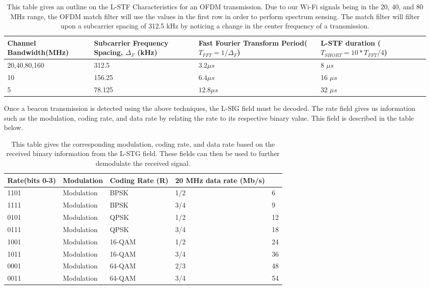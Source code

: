 \begin{table}[ht!]
	\centering
	\caption{This table gives an outline on the L-STF Characteristics for an OFDM transmission. Due to our Wi-Fi signals being in the 20, 40, and 80 MHz range, the OFDM match filter will use the values in the first row in order to perform spectrum sensing. The match filter will filter upon a subcarrier spacing of 312.5 kHz by noticing a change in the center frequency of a transmission.}	
\begin{tabular}{|p{3.6cm}|p{4cm}|p{4cm}|p{4.5cm}|}
	\hline
	Channel Bandwidth\newline(MHz) & Subcarrier Frequency Spacing, $\Delta_F$ (kHz) &Fast Fourier Transform Period\newline($T_{FFT}=1/\Delta_F$)& L-STF duration \newline($T_{SHORT}=10*T_{FFT}/4$) \\
	\hline
	20,40,80,160 & 312.5 &3.2$\mu s$ &8 $\mu s$ \\
	10 & 156.25 &$6.4\mu s$ &16 $\mu s $\\
	5 & 78.125 &$12.8\mu s$ &32 $\mu s$  \\
	\hline
\end{tabular} 

	\label{table:spacing}
\end{table} \par 
	
Once a beacon transmission is detected using the above techniques, the L-SIG field must be decoded. The rate field gives us information such as the modulation, coding rate, and data rate by relating the rate to its respective binary value. This field is described in the table below.
\begin{table}[ht!]
	\centering
		\caption{This table gives the corresponding modulation, coding rate, and data rate based on the received binary information from the L-STG field. These fields can then be used to further demodulate the received signal.}
	\begin{tabular}{|l|l|l|l|l|}
		\hline
		Rate(bits 0-3) & Modulation & Coding Rate (R) & 20 MHz data rate (Mb/s) & \\
		\hline
		1101 & Modulation & BPSK & 1/2 & 6 \\
		1111 & Modulation & BPSK & 3/4 & 9 \\
		0101 & Modulation & QPSK & 1/2 & 12 \\
		0111 & Modulation & QPSK & 3/4 & 18 \\
		1001 & Modulation & 16-QAM & 1/2 & 24 \\
		1011 & Modulation & 16-QAM & 3/4 & 36 \\
		0001 & Modulation & 64-QAM & 2/3 & 48 \\
		0011 & Modulation & 64-QAM & 3/4 & 54 \\						
		\hline
	\end{tabular}
	\label{table:ofdm_rate_table}
\end{table} \par

